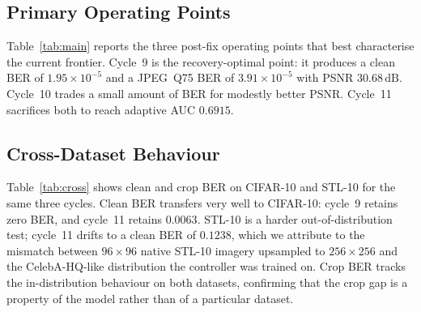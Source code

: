 \documentclass[journal]{IEEEtran}
\begin{document}
\subsection{Primary Operating Points}
Table~\ref{tab:main} reports the three post-fix operating points
that best characterise the current frontier. Cycle~9 is the
recovery-optimal point: it produces a clean BER of
$1.95\!\times\!10^{-5}$ and a JPEG~Q75 BER of
$3.91\!\times\!10^{-5}$ with PSNR $30.68\,\mathrm{dB}$.
Cycle~10 trades a small amount of BER for modestly better PSNR.
Cycle~11 sacrifices both to reach adaptive AUC $0.6915$.

\begin{table}[t]
\centering
\caption{Primary operating points from the post-fix evaluator. Lower
is better except for PSNR. BER numbers are reported at four
significant digits or in scientific notation where appropriate.
Clean-first, Curriculum, and Balanced refer to the strategy variants
in Section~\ref{sec:training}.}
\label{tab:main}
\end{table}

\subsection{Cross-Dataset Behaviour}
Table~\ref{tab:cross} shows clean and crop BER on CIFAR-10 and
STL-10 for the same three cycles. Clean BER transfers very well to
CIFAR-10: cycle~9 retains zero BER, and cycle~11 retains $0.0063$.
STL-10 is a harder out-of-distribution test; cycle~11 drifts to a
clean BER of $0.1238$, which we attribute to the mismatch between
$96{\times}96$ native STL-10 imagery upsampled to $256{\times}256$
and the CelebA-HQ-like distribution the controller was trained on.
Crop BER tracks the in-distribution behaviour on both datasets,
confirming that the crop gap is a property of the model rather than
of a particular dataset.

\begin{table}[t]
\centering
\caption{Post-fix cross-dataset behaviour. CIFAR and STL columns
give clean BER and crop~Q80 BER after bicubic upsampling to the
native resolution.}
\label{tab:cross}
\end{table}
\end{document}

